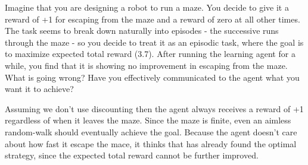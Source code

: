 
\begin{exercise}[Exercise 3.7]

Imagine that you are designing a robot to run a maze. You decide to give it a
reward of +1 for escaping from the maze and a reward of zero at all other times.
The task seems to break down naturally into episodes - the successive runs through the maze -
so you decide to treat it as an episodic task, where the goal is to maximize expected
total reward (3.7). After running the learning agent for a while, you find that it
is showing no improvement in escaping from the maze. What is going wrong?
Have you effectively communicated to the agent what you want it to achieve?

\end{exercise}


\begin{solution}

Assuming we don't use discounting then the agent always receives a reward of +1
regardless of when it leaves the maze. Since the maze is finite, even an aimless
random-walk should eventually achieve the goal. Because the agent doesn't care
about how fast it escape the mace, it thinks that has already found the optimal
strategy, since the expected total reward cannot be further improved.

\end{solution}

